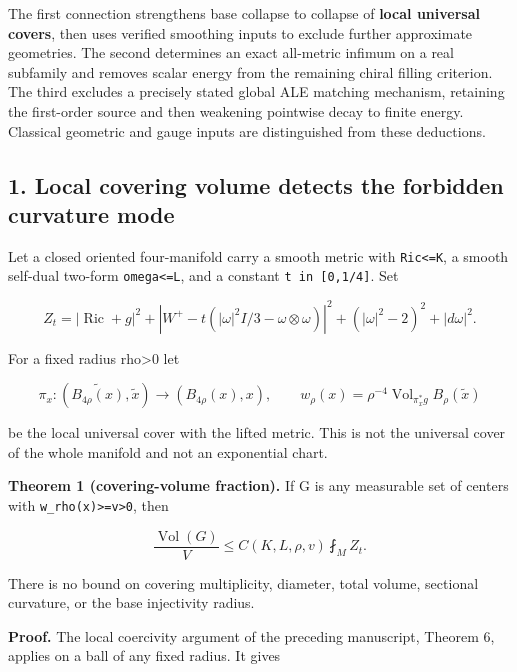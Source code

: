 \documentclass[
  10pt,
]{article}
\begin{document}
The first connection strengthens base collapse to collapse of
\textbf{local universal covers}, then uses verified smoothing inputs to
exclude further approximate geometries. The second determines an exact
all-metric infimum on a real subfamily and removes scalar energy from
the remaining chiral filling criterion. The third excludes a precisely
stated global ALE matching mechanism, retaining the first-order source
and then weakening pointwise decay to finite energy. Classical geometric
and gauge inputs are distinguished from these deductions.

\hypertarget{local-covering-volume-detects-the-forbidden-curvature-mode}{%
\subsection{1. Local covering volume detects the forbidden curvature
mode}\label{local-covering-volume-detects-the-forbidden-curvature-mode}}

Let a closed oriented four-manifold carry a smooth metric with
\texttt{\textbar{}Ric\textbar{}\textless{}=K}, a smooth self-dual
two-form \texttt{\textbar{}omega\textbar{}\textless{}=L}, and a constant
\texttt{t\ in\ {[}0,1/4{]}}. Set

\[
 Z_t=|\operatorname{Ric}+g|^2+
 |W^+-t(|\omega|^2 I/3-\omega\otimes\omega)|^2
 +( |\omega|^2-2)^2+|d\omega|^2.                 \tag{1.1}
\]

For a fixed radius rho\textgreater0 let

\[
 \pi_x:(\widetilde {B_{4\rho}(x)},\tilde x)
                   \longrightarrow(B_{4\rho}(x),x),\qquad
 w_\rho(x)=\rho^{-4}
       \operatorname{Vol}_{\pi_x^*g}B_\rho(\tilde x)   \tag{1.2}
\]

be the local universal cover with the lifted metric. This is not the
universal cover of the whole manifold and not an exponential chart.

\textbf{Theorem 1 (covering-volume fraction).} If G is any measurable
set of centers with \texttt{w\_rho(x)\textgreater{}=v\textgreater{}0},
then

\[
 \boxed{\frac{\operatorname{Vol}(G)}{V}
                  \le C(K,L,\rho,v)\fint_M Z_t.}      \tag{1.3}
\]

There is no bound on covering multiplicity, diameter, total volume,
sectional curvature, or the base injectivity radius.

\textbf{Proof.} The local coercivity argument of the preceding
manuscript, Theorem 6, applies on a ball of any fixed radius. It gives
\end{document}

